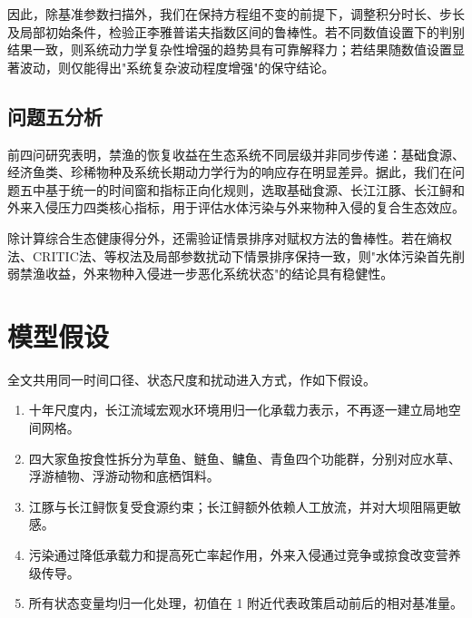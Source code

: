 \documentclass{MMCStyle}
\begin{document}
因此，除基准参数扫描外，我们在保持方程组不变的前提下，调整积分时长、步长及局部初始条件，检验正李雅普诺夫指数区间的鲁棒性。若不同数值设置下的判别结果一致，则系统动力学复杂性增强的趋势具有可靠解释力；若结果随数值设置显著波动，则仅能得出"系统复杂波动程度增强"的保守结论。

\subsection{问题五分析}
前四问研究表明，禁渔的恢复收益在生态系统不同层级并非同步传递：基础食源、经济鱼类、珍稀物种及系统长期动力学行为的响应存在明显差异。据此，我们在问题五中基于统一的时间窗和指标正向化规则，选取基础食源、长江江豚、长江鲟和外来入侵压力四类核心指标，用于评估水体污染与外来物种入侵的复合生态效应。

除计算综合生态健康得分外，还需验证情景排序对赋权方法的鲁棒性。若在熵权法、CRITIC法、等权法及局部参数扰动下情景排序保持一致，则"水体污染首先削弱禁渔收益，外来物种入侵进一步恶化系统状态"的结论具有稳健性。

\section{模型假设}
全文共用同一时间口径、状态尺度和扰动进入方式，作如下假设。
\begin{enumerate}
\item 十年尺度内，长江流域宏观水环境用归一化承载力表示，不再逐一建立局地空间网格。
\item 四大家鱼按食性拆分为草鱼、鲢鱼、鳙鱼、青鱼四个功能群，分别对应水草、浮游植物、浮游动物和底栖饵料。
\item 江豚与长江鲟恢复受食源约束；长江鲟额外依赖人工放流，并对大坝阻隔更敏感。
\item 污染通过降低承载力和提高死亡率起作用，外来入侵通过竞争或掠食改变营养级传导。
\item 所有状态变量均归一化处理，初值在 1 附近代表政策启动前后的相对基准量。
\end{enumerate}
\end{document}

